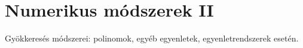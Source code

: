 \documentclass[../../main.tex]{subfiles}
\begin{document}
\section{Numerikus módszerek II}

\begin{fulltheorem}
	Gyökkeresés módszerei: polinomok, egyéb egyenletek, egyenletrendszerek esetén.
\end{fulltheorem}
\end{document}

